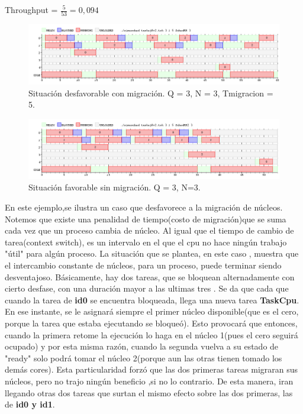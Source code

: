 \documentclass[10pt, a4paper]{article}
\begin{document}
\begin{center}
Throughput = $\frac{5}{53} = 0,094$
\end{center}


\begin{figure}[H]
  	\centering
   	\includegraphics[width=1\textwidth]
   	 {imgs/8Migracion2.png}
	\caption{Situación desfavorable con migración. Q = 3, N = 3, Tmigracion = 5.}
\end{figure}


\begin{figure}[H]
  	\centering
   	\includegraphics[width=1\textwidth]
   	 {imgs/8NoMigracion2.png}
	\caption{Situación favorable sin migración. Q = 3, N=3.}
\end{figure}

En este ejemplo,se ilustra un caso que desfavorece a la migración de núcleos. Notemos que existe una penalidad de tiempo(costo de migración)que se suma cada vez que
un proceso cambia de núcleo. Al igual que el tiempo de cambio de tarea(context switch), es un intervalo en el que el cpu no hace ningún trabajo "útil" para algún proceso.
La situación que se plantea, en este caso , muestra que el intercambio constante de núcleos, para un proceso, puede terminar siendo desventajoso.
Básicamente, hay dos tareas, que se bloquean alternadamente con cierto desfase, con una duración mayor a las ultimas tres . Se da que cada que cuando la tarea de \textbf{id0} se encuentra  bloqueada, llega una nueva tarea \textbf{TaskCpu}. En ese instante, se le asignará siempre  el primer núcleo disponible(que es el cero, porque la tarea que estaba ejecutando se bloqueó).
Esto provocará que entonces, cuando la primera retome la ejecución lo haga en el  núcleo 1(pues el cero seguirá ocupado) y por esta misma razón, cuando la segunda vuelva a su estado de  "ready" solo podrá tomar el núcleo 2(porque aun las otras tienen tomado los demás cores). Esta particularidad forzó que las dos primeras tareas migraran sus núcleos, pero no trajo ningún beneficio ,si no lo contrario. De esta manera, iran llegando otras dos tareas que surtan el mismo efecto sobre las dos primeras, las de \textbf{id0 y id1}.
\end{document}
